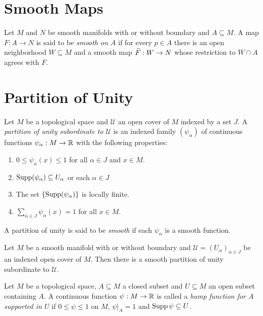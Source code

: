 \section{Smooth Maps}

\begin{definition}
    Let $M$ and $N$ be smooth manifolds with or without boundary and $A\subseteq M$. A map $F:A\to N$ is said to be \emph{smooth on $A$} if for every $p\in A$ there is an open neighborhood $W\subseteq M$ and a smooth map $\widetilde{F}: W\to N$ whose restriction to $W\cap A$ agrees with $F$.
\end{definition}

\section{Partition of Unity}

\begin{definition}
    Let $M$ be a topological space and $\mathscr U$ an open cover of $M$ indexed by a set $J$. A \emph{partition of unity subordinate to $\mathscr U$} is an indexed family $(\psi_{\alpha})$ of continuous functions $\psi_\alpha: M\to\mathbb{R}$ with the following properties: 
    \begin{enumerate}
        \item $0\le\psi_\alpha(x)\le 1$ for all $\alpha\in J$ and $x\in M$. 
        \item $\operatorname{Supp}(\psi_\alpha)\subseteq U_\alpha$ or each $\alpha\in J$
        \item The set $\{\operatorname{Supp}(\psi_\alpha)\}$ is locally finite.
        \item $\sum_{\alpha\in J}\psi_\alpha(x) = 1$ for all $x\in M$.
    \end{enumerate} 
    A partition of unity is said to be \emph{smooth} if each $\psi_\alpha$ is a smooth function.
\end{definition}

\begin{theorem}
    Let $M$ be a smooth manifold with or without boundary and $\mathscr U = (U_\alpha)_{\alpha\in J}$ be an indexed open cover of $M$. Then there is a smooth partition of unity subordinate to $\mathscr U$.
\end{theorem}

\begin{definition}
    Let $M$ be a topological space, $A\subseteq M$ a closed subset and $U\subseteq M$ an open subset containing $A$. A continuous function $\psi: M\to\mathbb{R}$ is called a \emph{bump function for $A$ supported in $U$} if $0\le\psi\le 1$ on $M$, $\psi|_A = 1$ and $\operatorname{Supp}\psi\subseteq U$.
\end{definition}

